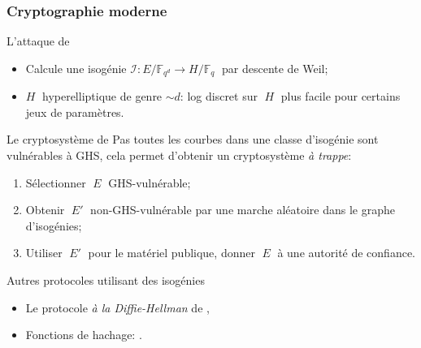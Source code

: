 \documentclass[10pt]{beamer}
\newcommand{\F}{\mathbb{F}}  %
\newcommand{\0}{\mathcal{O}}  %
\newcommand{\isog}[1]{\mathcal{#1}}  %
\newcommand{\I}{\isog{I}}  %
\begin{document}
\begin{frame}
  \frametitle{Cryptographie moderne}
  
  \begin{block}{L'attaque de \cite{gaudry+hess+smart02}}
    \begin{itemize}
    \item Calcule une isogénie $\I:E/\F_{q^d}\to H/\F_q\;$ par
      descente de Weil;
    \item $H\;$ hyperelliptique de genre $\sim d$: log discret sur
      $\;H\;$ plus facile pour certains jeux de paramètres.
    \end{itemize}
  \end{block}

  \vspace{-1mm}

  \begin{block}{Le cryptosystème de \cite{teske06}}
    Pas toutes les courbes dans une classe d'isogénie sont vulnérables
    à GHS, cela permet d'obtenir un cryptosystème \emph{à trappe}:
    \begin{enumerate}
    \item Sélectionner $\;E\;$ GHS-vulnérable;
    \item Obtenir $\;E'\;$ non-GHS-vulnérable par une marche
      aléatoire dans le graphe d'isogénies;
    \item Utiliser $\;E'\;$ pour le matériel publique, donner
      $\;E\;$ à une autorité de confiance.
    \end{enumerate}
  \end{block}

  \vspace{-1mm}

  \begin{block}{Autres protocoles utilisant des isogénies}
    \begin{itemize}
    \item Le protocole \emph{à la Diffie-Hellman} de \cite{rostovtsev+stolbunov06},
    \item Fonctions de hachage: \cite{charles+lauter+goren09}.
    \end{itemize}
  \end{block}
\end{frame}

\end{document}
